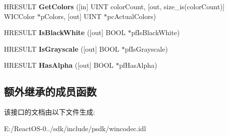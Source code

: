 \begin{DoxyCompactItemize}
H\+R\+E\+S\+U\+LT {\bfseries Get\+Colors} (\mbox{[}in\mbox{]} U\+I\+NT color\+Count, \mbox{[}out, size\+\_\+is(color\+Count)\mbox{]} W\+I\+C\+Color $\ast$p\+Colors, \mbox{[}out\mbox{]} U\+I\+NT $\ast$pc\+Actual\+Colors)
\item 
\mbox{\label{interface_i_w_i_c_palette_a3e316b3372cb1f1a56c09d2228ab1801}} 
H\+R\+E\+S\+U\+LT {\bfseries Is\+Black\+White} (\mbox{[}out\mbox{]} B\+O\+OL $\ast$pf\+Is\+Black\+White)
\item 
\mbox{\label{interface_i_w_i_c_palette_aba8c46e4ce30bf7c4401e7f683faf3c9}} 
H\+R\+E\+S\+U\+LT {\bfseries Is\+Grayscale} (\mbox{[}out\mbox{]} B\+O\+OL $\ast$pf\+Is\+Grayscale)
\item 
\mbox{\label{interface_i_w_i_c_palette_acb1b9eef0627e8187f31f5aadfb73aef}} 
H\+R\+E\+S\+U\+LT {\bfseries Has\+Alpha} (\mbox{[}out\mbox{]} B\+O\+OL $\ast$pf\+Has\+Alpha)
\end{DoxyCompactItemize}
\subsection*{额外继承的成员函数}


该接口的文档由以下文件生成\+:\begin{DoxyCompactItemize}
\item 
E\+:/\+React\+O\+S-\/0../sdk/include/psdk/wincodec.\+idl\end{DoxyCompactItemize}
